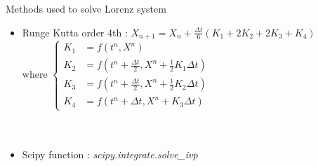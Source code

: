 \documentclass[10pt,xcolor={table,dvipsnames},t]{beamer}
\begin{document}
\begin{frame}[allowframebreaks]{Methods used to solve Lorenz system}
\begin{itemize}
        \item Runge Kutta order 4th : \qquad
        $X_{n+1}=X_n+\frac{\Delta t}{6}\left(K_1+2K_2+2K_3+K_4\right)$ \\
        where \qquad $\left\{\begin{aligned}
            K_1&=f(t^n,X^n) \\
            K_2&=f\left(t^n+\frac{\Delta t}{2},X^n+\frac{1}{2} K_1\Delta t\right) \\
            K_3&=f\left(t^n+\frac{\Delta t}{2},X^n+\frac{1}{2} K_2\Delta t\right) \\
            K_4&=f\left(t^n+\Delta t,X^n+K_3\Delta t\right)
        \end{aligned}\right.$ \\ \; \\ \; \\
        
        \item Scipy function : \qquad \textit{scipy.integrate.solve\_ivp}
    \end{itemize}

\end{frame}
\end{document}
